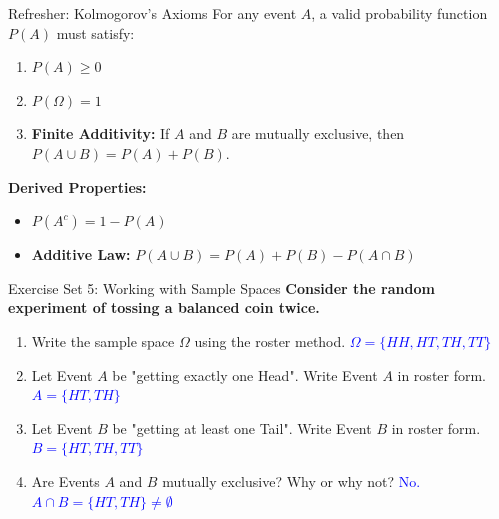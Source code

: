\documentclass[aspectratio=169]{beamer}
\begin{document}
\begin{frame}{Refresher: Kolmogorov's Axioms}
    For any event $A$, a valid probability function $P(A)$ must satisfy:
    \begin{enumerate}
        \item $P(A) \geq 0$
        \item $P(\Omega) = 1$
        \item \textbf{Finite Additivity:} If $A$ and $B$ are mutually exclusive, then $P(A \cup B) = P(A) + P(B)$.
    \end{enumerate}
    \vspace{0.3cm}
    \textbf{Derived Properties:}
    \begin{itemize}
        \item $P(A^c) = 1 - P(A)$
        \item \textbf{Additive Law:} $P(A \cup B) = P(A) + P(B) - P(A \cap B)$
    \end{itemize}
\end{frame}

\begin{frame}{Exercise Set 5: Working with Sample Spaces}
    \textbf{Consider the random experiment of tossing a balanced coin twice.}
    \vspace{0.3cm}
    \begin{enumerate}
        \item Write the sample space $\Omega$ using the roster method. \pause \hfill \textcolor{blue}{$\Omega = \{HH, HT, TH, TT\}$}
        \item Let Event $A$ be "getting exactly one Head". Write Event $A$ in roster form. \pause \hfill \textcolor{blue}{$A = \{HT, TH\}$}
        \item Let Event $B$ be "getting at least one Tail". Write Event $B$ in roster form. \pause \hfill \textcolor{blue}{$B = \{HT, TH, TT\}$}
        \item Are Events $A$ and $B$ mutually exclusive? Why or why not? \pause \hfill \textcolor{blue}{No. $A \cap B = \{HT, TH\} \neq \emptyset$}
    \end{enumerate}
\end{frame}
\end{document}
